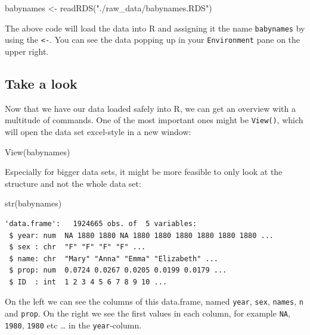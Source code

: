 \documentclass[
  letterpaper,
  DIV=11,
  numbers=noendperiod]{scrartcl}
\newenvironment{Shaded}{\begin{snugshade}}{\end{snugshade}}
\newcommand{\FunctionTok}[1]{\textcolor[rgb]{0.28,0.35,0.67}{#1}}
\newcommand{\NormalTok}[1]{\textcolor[rgb]{0.00,0.23,0.31}{#1}}
\newcommand{\OtherTok}[1]{\textcolor[rgb]{0.00,0.23,0.31}{#1}}
\newcommand{\StringTok}[1]{\textcolor[rgb]{0.13,0.47,0.30}{#1}}
\begin{document}
\begin{Shaded}
\begin{Highlighting}[]
\NormalTok{babynames }\OtherTok{\textless{}{-}} \FunctionTok{readRDS}\NormalTok{(}\StringTok{"./raw\_data/babynames.RDS"}\NormalTok{)}
\end{Highlighting}
\end{Shaded}

The above code will load the data into R and assigning it the name
\texttt{babynames} by using the \texttt{\textless{}-}. You can see the
data popping up in your \texttt{Environment} pane on the upper right.

\hypertarget{take-a-look}{%
\subsection{Take a look}\label{take-a-look}}

Now that we have our data loaded safely into R, we can get an overview
with a multitude of commands. One of the most important ones might be
\texttt{View()}, which will open the data set excel-style in a new
window:

\begin{Shaded}
\begin{Highlighting}[]
\FunctionTok{View}\NormalTok{(babynames)}
\end{Highlighting}
\end{Shaded}

Especially for bigger data sets, it might be more feasible to only look
at the structure and not the whole data set:

\begin{Shaded}
\begin{Highlighting}[]
\FunctionTok{str}\NormalTok{(babynames)}
\end{Highlighting}
\end{Shaded}

\begin{verbatim}
'data.frame':   1924665 obs. of  5 variables:
 $ year: num  NA 1880 1880 NA 1880 1880 1880 1880 1880 1880 ...
 $ sex : chr  "F" "F" "F" "F" ...
 $ name: chr  "Mary" "Anna" "Emma" "Elizabeth" ...
 $ prop: num  0.0724 0.0267 0.0205 0.0199 0.0179 ...
 $ ID  : int  1 2 3 4 5 6 7 8 9 10 ...
\end{verbatim}

On the left we can see the columns of this data.frame, named
\texttt{year}, \texttt{sex}, \texttt{names}, \texttt{n} and
\texttt{prop}. On the right we see the first values in each column, for
example \texttt{NA}, \texttt{1980}, \texttt{1980} etc \ldots{} in the
\texttt{year}-column.
\end{document}
